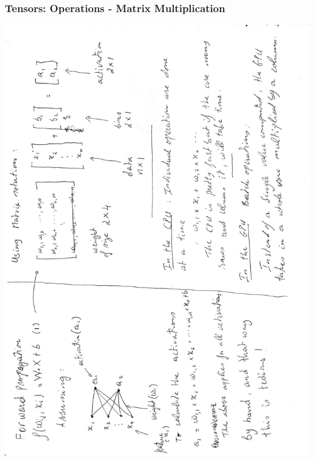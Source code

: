 \documentclass[11pt]{beamer}
\begin{document}
\begin{frame}
	\frametitle{Tensors: Operations - Matrix Multiplication}
	\centering
\includegraphics[width=\textwidth+2cm,height=\textheight+2cm,keepaspectratio, angle = -90 ]{demo.pdf}
\end{frame}
\end{document}
